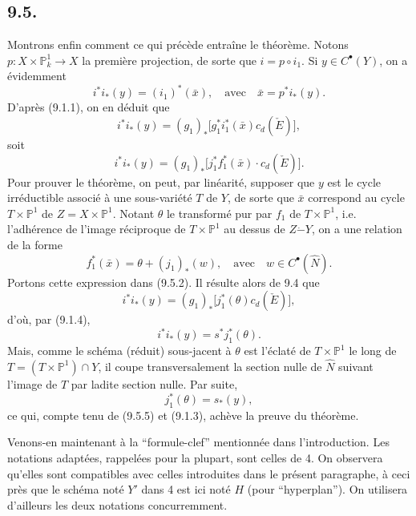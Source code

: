 \subsection*{9.5.}

Montrons enfin comment ce qui précède entraîne le théorème. Notons $p:X\times\mathbb{P}^1_k\to X$ la première projection, de sorte que $i=p\circ i_1$. Si $y\in C^{\bullet}(Y)$, on a évidemment
\[
i^*i_*(y)=(i_1)^*(\bar x),\quad\text{avec}\quad \bar x=p^*i_*(y).
\tag{9.5.1}
\]
D'après (9.1.1), on en déduit que
\[
i^*i_*(y)=(g_1)_*\bigl[g_1^*i_1^*(\bar x)c_d(\check E)\bigr],
\]
soit
\[
i^*i_*(y)=(g_1)_*\bigl[j_1^*f_1^*(\bar x)\cdot c_d(\check E)\bigr].
\tag{9.5.2}
\]
Pour prouver le théorème, on peut, par linéarité, supposer que $y$ est le cycle irréductible associé à une sous-variété $T$ de $Y$, de sorte que $\bar x$ correspond au cycle $T\times\mathbb{P}^1$ de $Z=X\times\mathbb{P}^1$. Notant $\theta$ le transformé pur par $f_1$ de $T\times\mathbb{P}^1$, i.e. l'adhérence de l'image réciproque de $T\times\mathbb{P}^1$ au dessus de $Z\mathbin{\dot{-}}Y$, on a une relation de la forme
\[
f_1^*(\bar x)=\theta+(j_1)_*(w),\quad\text{avec}\quad w\in C^{\bullet}(\widehat N).
\tag{9.5.3}
\]
Portons cette expression dans (9.5.2). Il résulte alors de 9.4 que
\[
i^*i_*(y)=(g_1)_*\bigl[j_1^*(\theta)c_d(\check E)\bigr],
\tag{9.5.4}
\]
d'où, par (9.1.4),
\[
i^*i_*(y)=s^*j_1^*(\theta).
\tag{9.5.5}
\]
Mais, comme le schéma (réduit) sous-jacent à $\theta$ est l'éclaté de $T\times\mathbb{P}^1$ le long de $T=(T\times\mathbb{P}^1)\cap Y$, il coupe transversalement la section nulle de $\widehat N$ suivant l'image de $T$ par ladite section nulle. Par suite,
\[
j_1^*(\theta)=s_*(y),
\]
ce qui, compte tenu de (9.5.5) et (9.1.3), achève la preuve du théorème.

Venons-en maintenant à la ``formule-clef'' mentionnée dans l'introduction. Les notations adaptées, rappelées pour la plupart, sont celles de 4. On observera qu'elles sont compatibles avec celles introduites dans le présent paragraphe, à ceci près que le schéma noté $Y'$ dans 4 est ici noté $H$ (pour ``hyperplan''). On utilisera d'ailleurs les deux notations concurremment.

